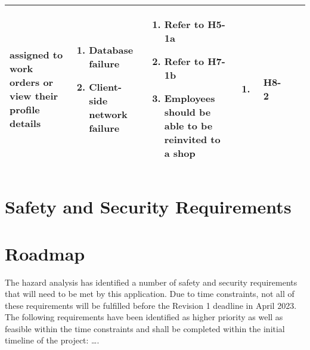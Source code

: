 \documentclass{article}
\begin{document}
\begin{landscape}
\begin{longtable}{|p{}|p{}|p{}|p{}|p{}|p{}|p{}|}
		assigned to work orders or view their profile details
		 & \begin{enumerate}[label=\alph*., leftmargin=*]
			   \item Database failure
			   \item Client-side network failure
		   \end{enumerate}
		 & \begin{enumerate}[label=\alph*., leftmargin=*]
			   \item Refer to H5-1a
			   \item Refer to H7-1b
			   \item Employees should be able to be reinvited to a shop
		   \end{enumerate}
		 & \begin{enumerate}[label=\alph*., leftmargin=*]
			   \item
		   \end{enumerate}
		 & H8-2                                                                                                         \\
		\hline
	\end{longtable}
\end{landscape}

\section{Safety and Security Requirements}


\section{Roadmap}

The hazard analysis has identified a number of safety and security requirements that will need to
be met by this application. Due to time constraints, not all of these requirements will be
fulfilled before the Revision 1 deadline in April 2023. The following requirements have been
identified as higher priority as well as feasible within the time constraints and shall be
completed within the initial timeline of the project: \dots.
\end{document}

